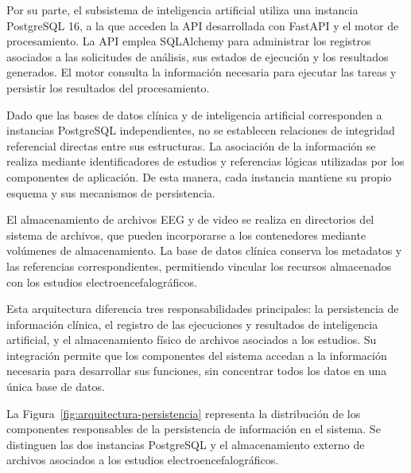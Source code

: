 Por su parte, el subsistema de inteligencia artificial
utiliza una instancia PostgreSQL 16, a la que acceden
la API desarrollada con FastAPI y el motor de procesamiento.
La API emplea SQLAlchemy para administrar los registros
asociados a las solicitudes de análisis, sus estados de
ejecución y los resultados generados. El motor consulta
la información necesaria para ejecutar las tareas y
persistir los resultados del procesamiento.


Dado que las bases de datos clínica y de inteligencia
artificial corresponden a instancias PostgreSQL
independientes, no se establecen relaciones de integridad
referencial directas entre sus estructuras. La asociación
de la información se realiza mediante identificadores
de estudios y referencias lógicas utilizadas por los
componentes de aplicación. De esta manera, cada instancia
mantiene su propio esquema y sus mecanismos de persistencia.


El almacenamiento de archivos EEG y de video se realiza
en directorios del sistema de archivos, que pueden
incorporarse a los contenedores mediante volúmenes de
almacenamiento. La base de datos clínica conserva los
metadatos y las referencias correspondientes, permitiendo
vincular los recursos almacenados con los estudios
electroencefalográficos.

Esta arquitectura diferencia tres responsabilidades
principales: la persistencia de información clínica,
el registro de las ejecuciones y resultados de
inteligencia artificial, y el almacenamiento físico
de archivos asociados a los estudios. Su integración
permite que los componentes del sistema accedan a la
información necesaria para desarrollar sus funciones,
sin concentrar todos los datos en una única base
de datos.

La Figura~\ref{fig:arquitectura-persistencia}
representa la distribución de los componentes
responsables de la persistencia de información
en el sistema. Se distinguen las dos instancias
PostgreSQL y el almacenamiento externo de archivos
asociados a los estudios electroencefalográficos.


